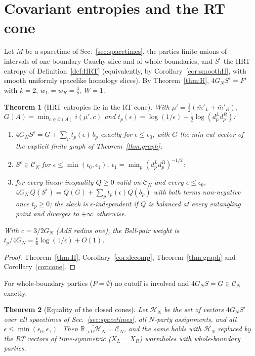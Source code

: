 \documentclass[aps,prd,onecolumn,superscriptaddress,nofootinbib,amsmath,amssymb,11pt]{revtex4-2}
\newtheorem{theorem}{Theorem}[section]
\theoremstyle{definition}
\newcommand{\R}{\mathbb{R}}
\newcommand{\Cut}{\mathcal{C}}
\newcommand{\CN}{\mathcal{C}_N}
\newcommand{\eps}{\epsilon}
\newcommand{\mbar}{\bar m}
\begin{document}
\section{Covariant entropies and the RT cone}\label{sec:main}

Let $M$ be a spacetime of Sec.~\ref{sec:spacetimes}, the parties finite unions of intervals of one boundary Cauchy slice and of
whole boundaries, and $S^\eps$ the HRT entropy of Definition~\ref{def:HRT} (equivalently, by Corollary~\ref{cor:smoothH}, with
smooth uniformly spacelike homology slices). By Theorem~\ref{thm:H}, $4G_NS^\eps=F^\eps$ with $k=2$, $w_L=w_R=\frac12$, $W=1$.

\begin{theorem}[HRT entropies lie in the RT cone]\label{thm:HRTcone}
With $\mu'=\frac12(\mbar'_L+\mbar'_R)$, $G(A)=\min_{c\in\Cut(A)}i(\mu',c)$ and $t_p(\eps)=\log(1/\eps)-\frac12\log(d_p^Ld_p^R)$:
\begin{enumerate}
\item[(i)] $4G_NS^\eps=G+\sum_pt_p(\eps)\,b_p$ exactly for $\eps\le\eps_0$, with $G$ the min-cut vector of the explicit finite graph
of Theorem~\ref{thm:graph};
\item[(ii)] $S^\eps\in\CN$ for $\eps\le\min(\eps_0,\eps_1)$, $\eps_1=\min_p(d_p^Ld_p^R)^{-1/2}$;
\item[(iii)] for every linear inequality $Q\ge0$ valid on $\CN$ and every $\eps\le\eps_0$,
$4G_N\,Q(S^\eps)=Q(G)+\sum_pt_p(\eps)Q(b_p)$ with both terms non-negative once $t_p\ge0$; the slack is $\eps$-independent if $Q$ is
balanced at every entangling point and diverges to $+\infty$ otherwise.
\end{enumerate}
With $c=3/2G_N$ (AdS radius one), the Bell-pair weight is $t_p/4G_N=\frac c6\log(1/\eps)+O(1)$.
\end{theorem}

\begin{proof}
Theorem~\ref{thm:H}, Corollary~\ref{cor:decomp}, Theorem~\ref{thm:graph} and Corollary~\ref{cor:cone}.
\end{proof}

For whole-boundary parties ($P=\emptyset$) no cutoff is involved and $4G_NS=G\in\CN$ exactly.

\begin{theorem}[Equality of the closed cones]\label{thm:equality}
Let $\mathcal H_N$ be the set of vectors $4G_NS^\eps$ over all spacetimes of Sec.~\ref{sec:spacetimes}, all $N$-party assignments,
and all $\eps\le\min(\eps_0,\eps_1)$. Then $\overline{\R_{>0}\mathcal H_N}=\CN$, and the same holds with $\mathcal H_N$ replaced by the
RT vectors of time-symmetric ($X_L=X_R$) wormholes with whole-boundary parties.
\end{theorem}
\end{document}
